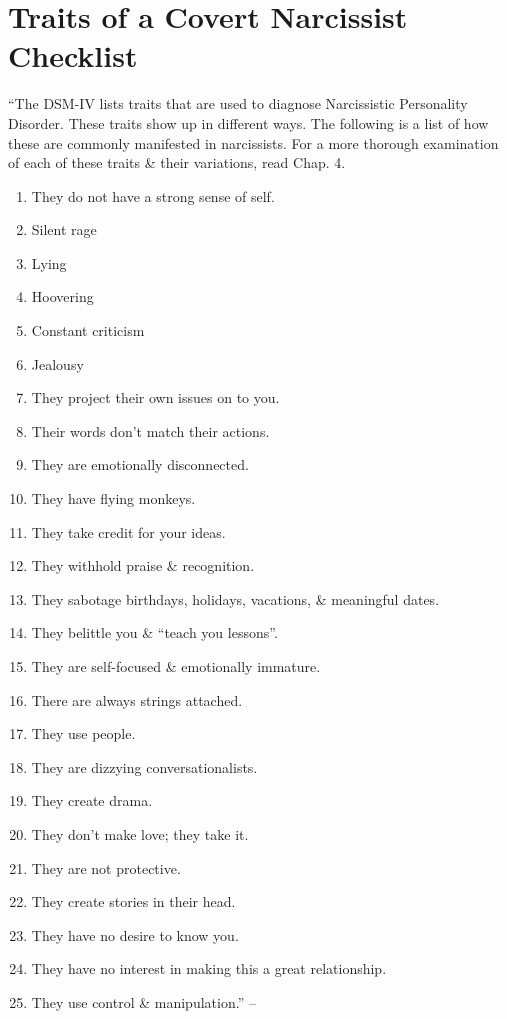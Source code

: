 \documentclass{article}
\numberwithin{equation}{section}
\begin{document}

\section{Traits of a Covert Narcissist Checklist}
``The DSM-IV lists traits that are used to diagnose Narcissistic Personality Disorder. These traits show up in different ways. The following is a list of how these are commonly manifested in narcissists. For a more thorough examination of each of these traits \& their variations, read Chap. 4.
\begin{enumerate}
	\item They do not have a strong sense of self.
	\item Silent rage
	\item Lying
	\item Hoovering
	\item Constant criticism
	\item Jealousy
	\item They project their own issues on to you.
	\item Their words don't match their actions.
	\item They are emotionally disconnected.
	\item They have flying monkeys.
	\item They take credit for your ideas.
	\item They withhold praise \& recognition.
	\item They sabotage birthdays, holidays, vacations, \& meaningful dates.
	\item They belittle you \& ``teach you lessons''.
	\item They are self-focused \& emotionally immature.
	\item There are always strings attached.
	\item They use people.
	\item They are dizzying conversationalists.
	\item They create drama.
	\item They don't make love; they take it.
	\item They are not protective.
	\item They create stories in their head.
	\item They have no desire to know you.
	\item They have no interest in making this a great relationship.
	\item They use control \& manipulation.'' -- \cite[pp. 171--172]{Mirza2017}
\end{enumerate}
\end{document}
